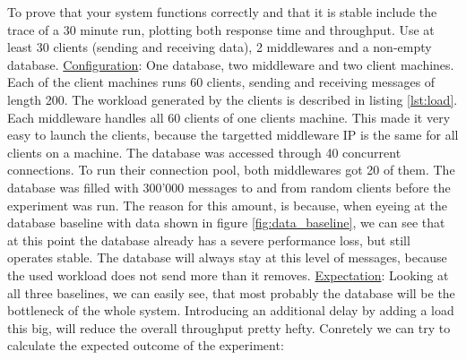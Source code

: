 \documentclass[11pt]{article}
\begin{document}
To prove that your system functions correctly and that it is stable
include the trace of a 30 minute run, plotting both response time and
throughput. Use at least 30 clients (sending and receiving data), 2
middlewares and a non-empty database.
\newline\underline{Configuration}: One database, two middleware and two client machines. Each of the client machines runs 60 clients, sending and receiving messages of length 200. The workload generated by the clients is described in listing \ref{lst:load}. Each middleware handles all 60 clients of one clients machine. This made it very easy to launch the clients, because the targetted middleware IP is the same for all clients on a machine. The database was accessed through 40 concurrent connections. To run their connection pool, both middlewares got 20 of them. The database was filled with 300'000 messages to and from random clients before the experiment was run. The reason for this amount, is because, when eyeing at the database baseline with data shown in figure \ref{fig:data_baseline}, we can see that at this point the database already has a severe performance loss, but still operates stable. The database will always stay at this level of messages, because the used workload does not send more than it removes.
\newline\underline{Expectation}: Looking at all three baselines, we can easily see, that most probably the database will be the bottleneck of the whole system. Introducing an additional delay by adding a load this big, will reduce the overall throughput pretty hefty. Conretely we can try to calculate the expected outcome of the experiment:
\end{document}
